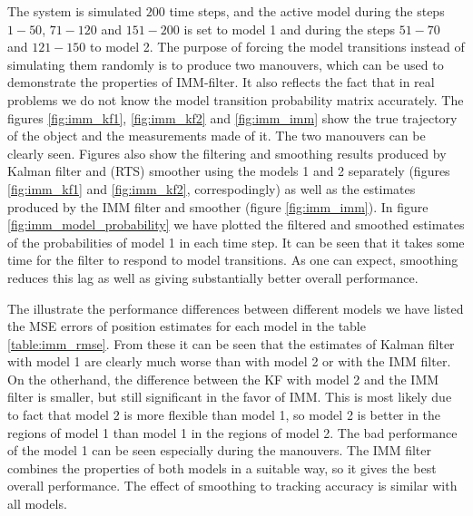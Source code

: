 The system is simulated $200$ time steps, and the active model during
the steps $1-50$, $71-120$ and $151-200$ is set to model 1 and during
the steps $51-70$ and $121-150$ to model 2. The purpose of forcing the
model transitions instead of simulating them randomly is to produce
two manouvers, which can be used to demonstrate the properties of
IMM-filter. It also reflects the fact that in real problems we do not
know the model transition probability matrix accurately. The figures
\ref{fig:imm_kf1}, \ref{fig:imm_kf2} and \ref{fig:imm_imm} show the
true trajectory of the object and the measurements made of it. The two
manouvers can be clearly seen. Figures also show the filtering and
smoothing results produced by Kalman filter and (RTS) smoother using
the models 1 and 2 separately (figures \ref{fig:imm_kf1} and
\ref{fig:imm_kf2}, correspodingly) as well as the estimates produced
by the IMM filter and smoother (figure \ref{fig:imm_imm}).  In figure
\ref{fig:imm_model_probability} we have plotted the filtered and
smoothed estimates of the probabilities of model 1 in each time
step. It can be seen that it takes some time for the filter to respond
to model transitions. As one can expect, smoothing reduces this lag as
well as giving substantially better overall performance.

The illustrate the performance differences between different models we
have listed the MSE errors of position estimates for each model in the
table \ref{table:imm_rmse}. From these it can be seen that the
estimates of Kalman filter with model 1 are clearly much worse than
with model 2 or with the IMM filter. On the otherhand, the difference
between the KF with model 2 and the IMM filter is smaller, but still
significant in the favor of IMM. This is most likely due to fact that
model 2 is more flexible than model 1, so model 2 is better in the
regions of model 1 than model 1 in the regions of model 2. The bad
performance of the model 1 can be seen especially during the
manouvers. The IMM filter combines the properties of both models in a
suitable way, so it gives the best overall performance. The effect of
smoothing to tracking accuracy is similar with all models.

